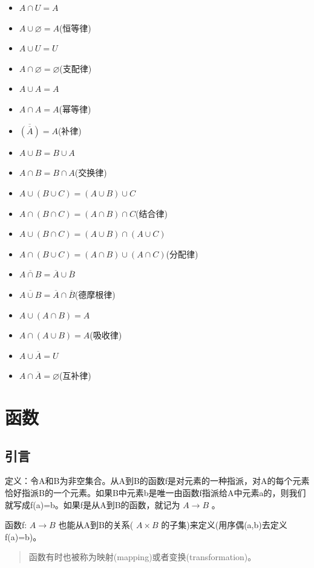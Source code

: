 \documentclass[12pt,a4paper,oneside]{ctexart}
\begin{document}
\begin{itemize}
\item
  \(A\cap U=A\)
\item
  \(A\cup\varnothing=A\)(恒等律)
\item
  \(A\cup U=U\)
\item
  \(A\cap \varnothing=\varnothing\)(支配律)
\item
  \(A\cup A=A\)
\item
  \(A\cap A=A\)(幂等律)
\item
  \(\overline{(\overline{A})}=A\)(补律)
\item
  \(A\cup B=B\cup A\)
\item
  \(A\cap B=B\cap A\)(交换律)
\item
  \(A\cup(B\cup C)=(A\cup B)\cup C\)
\item
  \(A\cap(B\cap C)=(A\cap B)\cap C\)(结合律)
\item
  \(A\cup(B\cap C)=(A\cup B)\cap(A\cup C)\)
\item
  \(A\cap(B\cup C)=(A\cap B)\cup(A\cap C)\)(分配律)
\item
  \(\overline{A\cap B}=\overline{A}\cup\overline{B}\)
\item
  \(\overline{A\cup B}=\overline{A}\cap\overline{B}\)(德摩根律)
\item
  \(A\cup(A\cap B)=A\)
\item
  \(A\cap(A\cup B)=A\)(吸收律)
\item
  \(A\cup\overline{A}=U\)
\item
  \(A\cap\overline{A}=\varnothing\)(互补律)
\end{itemize}

\section*{函数}

\subsection*{引言}

定义：令A和B为非空集合。从A到B的函数f是对元素的一种指派，对A的每个元素恰好指派B的一个元素。如果B中元素b是唯一由函数f指派给A中元素a的，则我们就写成f(a)=b。如果f是从A到B的函数，就记为 \(A\rightarrow B\) 。

函数f: \(A\rightarrow B\) 也能从A到B的关系( \(A\times B\) 的子集)来定义(用序偶(a,b)去定义f(a)=b)。

\begin{quote}
函数有时也被称为映射(mapping)或者变换(transformation)。
\end{quote}
\end{document}
